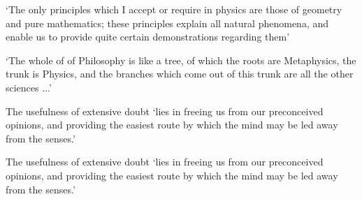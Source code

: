 \documentclass[12pt]{extarticle}
\begin{document}
\begin{multicols*}{3}
‘The only principles which I accept or require in physics are those of geometry and pure mathematics;  these principles explain all natural phenomena, and enable us to provide quite certain demonstrations  regarding them’  
\citep[p.~247 AT 2:64]{descartes:1985_csm1}
 
‘The whole of of Philosophy is like a tree, of which the roots are Metaphysics,
the trunk is Physics, and the branches which come out of this trunk are all the
other sciences ...’
\citep[p.~186]{descartes:1985_csm1}
 
The usefulness of extensive doubt ‘lies in freeing us from our preconceived opinions,  and providing the easiest route by which the mind may be  led away from the senses.’
 
The usefulness of extensive doubt ‘lies in freeing us from our preconceived opinions,  and providing the easiest route by which the mind may be  led away from the senses.’
 
 









\footnotesize


\end{multicols*}
\end{document}
